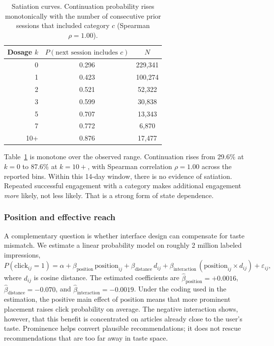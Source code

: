 \documentclass[11pt]{article}
\begin{document}
\begin{table}[ht]
\centering
\caption{Satiation curves. Continuation probability rises monotonically with the number of consecutive prior sessions that included category $c$ (Spearman $\rho = 1.00$).}
\label{tab:satiation}
\begin{tabular}{rcc}
\toprule
Dosage $k$ & $P(\text{next session includes } c)$ & $N$ \\
\midrule
0 & 0.296 & 229,341 \\
1 & 0.423 & 100,274 \\
2 & 0.521 & 52,322 \\
3 & 0.599 & 30,838 \\
5 & 0.707 & 13,343 \\
7 & 0.772 & 6,870 \\
10+ & 0.876 & 17,477 \\
\bottomrule
\end{tabular}
\end{table}
\FloatBarrier

Table~\ref{tab:satiation} is monotone over the observed range. Continuation rises from 29.6\% at $k=0$ to 87.6\% at $k=10+$, with Spearman correlation $\rho = 1.00$ across the reported bins. Within this 14-day window, there is no evidence of satiation. Repeated successful engagement with a category makes additional engagement \emph{more} likely, not less likely. That is a strong form of state dependence.

\subsubsection{Position and effective reach}

A complementary question is whether interface design can compensate for taste mismatch. We estimate a linear probability model on roughly 2 million labeled impressions,
\[
P(\text{click}_{ij}=1)
=
\alpha
+
\beta_{\text{position}}\,\text{position}_{ij}
+
\beta_{\text{distance}}\,d_{ij}
+
\beta_{\text{interaction}}\,(\text{position}_{ij}\times d_{ij})
+
\varepsilon_{ij},
\]
where $d_{ij}$ is cosine distance. The estimated coefficients are $\hat\beta_{\text{position}} = +0.0016$, $\hat\beta_{\text{distance}} = -0.070$, and $\hat\beta_{\text{interaction}} = -0.0019$. Under the coding used in the estimation, the positive main effect of position means that more prominent placement raises click probability on average. The negative interaction shows, however, that this benefit is concentrated on articles already close to the user's taste. Prominence helps convert plausible recommendations; it does not rescue recommendations that are too far away in taste space.
\end{document}
